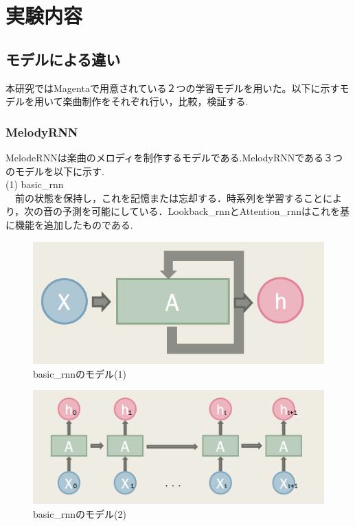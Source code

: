 \chapter{実験内容}
\section{モデルによる違い}
本研究ではMagentaで用意されている２つの学習モデルを用いた。以下に示すモデルを用いて楽曲制作をそれぞれ行い，比較，検証する.
\subsection{MelodyRNN}
MelodeRNNは楽曲のメロディを制作するモデルである.MelodyRNNである３つのモデルを以下に示す.\\
(1) basic\_rnn\\
　前の状態を保持し，これを記憶または忘却する．時系列を学習することにより，次の音の予測を可能にしている．Lookback\_rnnとAttention\_rnnはこれを基に機能を追加したものである.
\begin{figure}[!ht]
    \begin{screen}
    \begin{center}
        \includegraphics[scale=1,clip]{./img/basic3.png}
        \caption{basic\_rnnのモデル(1)}
        \label{fig:basicrnnのモデル(1)}
    \end{center}
    \end{screen}
\end{figure}
\newpage
\begin{figure}[!ht]
    \begin{screen}
    \begin{center}
        \includegraphics[scale=0.8,clip]{./img/basic4.png}
        \caption{basic\_rnnのモデル(2)}
        \label{fig:basic_rnnのモデル(2)}
    \end{center}
    \end{screen}
\end{figure}

